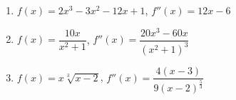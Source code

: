 \begin{enumerate}
\setcounter{enumi}{\value{HW}}


\item\label{concavederivativeexercisefirst}  $f(x) = 2x^{3}-3x^{2}-12x + 1$,  $f''(x) = 12x - 6$

\smallskip

\item $f(x) = \dfrac{10x}{x^2+1}$,  $f''(x) = \dfrac{20x^3-60x}{\left(x^2+1\right)^3}$

\smallskip

\item\label{concavederivativeexerciselast} $f(x) = x \sqrt[3]{x-2}$, $f''(x)=\dfrac{4(x-3)}{9(x-2)^{\frac{5}{3}}}$ 

\smallskip

\setcounter{HW}{\value{enumi}}
\end{enumerate}

